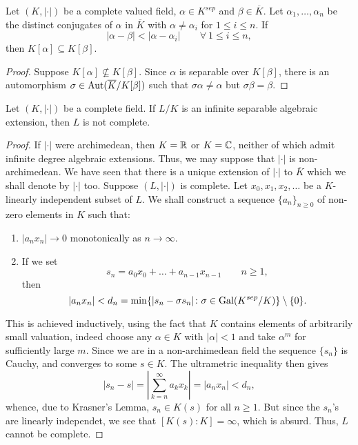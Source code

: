 \begin{lemma}[Krasner]
    Let $(K, |\cdot|)$ be a complete valued field, $\alpha\in K^{sep}$ and $\beta\in\overline K$. Let $\alpha_1,\dots,\alpha_n$ be the distinct conjugates of $\alpha$ in $\overline K$ with $\alpha\ne\alpha_i$ for $1\le i\le n$. If 
    \begin{equation*}
        |\alpha - \beta| < |\alpha - \alpha_i|\qquad\forall~1\le i\le n,
    \end{equation*}
    then $K[\alpha]\subseteq K[\beta]$.
\end{lemma}
\begin{proof}
    Suppose $K[\alpha]\not\subseteq K[\beta]$. Since $\alpha$ is separable over $K[\beta]$, there is an automorphism $\sigma\in\operatorname{Aut}(\overline K/K[\beta])$ such that $\sigma\alpha\ne\alpha$ but $\sigma\beta = \beta$.
\end{proof}

\begin{theorem}
    Let $(K, |\cdot|)$ be a complete field. If $L/K$ is an infinite separable algebraic extension, then $L$ is not complete.
\end{theorem}
\begin{proof}
    If $|\cdot|$ were archimedean, then $K = \mathbb{R}$ or $K = \mathbb{C}$, neither of which admit infinite degree algebraic extensions. Thus, we may suppose that $|\cdot|$ is non-archimedean. We have seen that there is a unique extension of $|\cdot|$ to $\overline K$ which we shall denote by $|\cdot|$ too. Suppose $(L, |\cdot|)$ is complete. Let $x_0, x_1, x_2,\dots$ be a $K$-linearly independent subset of $L$. We shall construct a sequence $\{a_{n}\}_{n\ge 0}$ of non-zero elements in $K$ such that: 
    \begin{enumerate}[label=(\arabic*)]
        \item $|a_nx_n|\to 0$ monotonically as $n\to\infty$.
        \item If we set 
        \begin{equation*}
            s_n = a_0x_0 + \dots + a_{n - 1}x_{n - 1}\qquad n\ge 1,
        \end{equation*}
        then 
        \begin{equation*}
            |a_nx_n| < d_n = \min\{|s_n - \sigma s_n|\colon\sigma\in\operatorname{Gal}(K^{sep}/K)\}\setminus\{0\}.
        \end{equation*}
    \end{enumerate}
    This is achieved inductively, using the fact that $K$ contains elements of arbitrarily small valuation, indeed choose any $\alpha\in K$ with $|\alpha| < 1$ and take $\alpha^m$ for sufficiently large $m$. Since we are in a non-archimedean field the sequence $\{s_n\}$ is Cauchy, and converges to some $s\in K$. The ultrametric inequality then gives 
    \begin{equation*}
        |s_n - s| = \left|\sum_{k = n}^\infty a_k x_k\right| = |a_nx_n| < d_n,
    \end{equation*}
    whence, due to Krasner's Lemma, %
    $s_n\in K(s)$ for all $n\ge 1$. But since the $s_n$'s are linearly independet, we see that $[K(s) : K] = \infty$, which is absurd. Thus, $L$ cannot be complete.
\end{proof}

